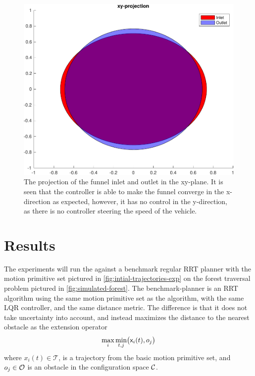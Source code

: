 \begin{figure}
  \centering
  \includegraphics[width=.8\textwidth]{figures/experiments/funnel-inlet-outlet}
  \caption[The projection of the funnel inlet and outlet in the xy-plane]{The projection of the funnel inlet and outlet in the xy-plane. It is
    seen that the controller is able to make the funnel converge in the
    x-direction as expected, however, it has no control in the y-direction, as
    there is no controller steering the speed of the vehicle.}
  \label{fig:funnel-inlet-outlet}
\end{figure}

\section{Results}
\label{sec:experiments-final}

The experiments will run the \rrtfunnel{} against a benchmark regular RRT
planner with the motion primitive set pictured in
\cref{fig:intial-trajectories-exp} on the forest traversal problem pictured in
\cref{fig:simulated-forest}. The benchmark-planner is an \ac{RRT} algorithm
using the same motion primitive set as the \rrtfunnel{} algorithm, with the same
\ac{LQR} controller, and the same distance metric. The difference is that it
does not take uncertainty into account, and instead maximizes the distance to
the nearest obstacle as the extension operator \ie{}
\begin{equation}
  \max_{i}\min_{t,j} \bigl( {\mathbf{\mathsf{x}}}_{i}(t), o_{j} \bigr)
\end{equation}
where \(x_{i}(t) \in \mathcal{T}\), is a trajectory from the basic motion
primitive set, and \(o_{j} \in \mathcal{O}{}\) is an obstacle in the
configuration space \(\mathcal{C}{}\).


